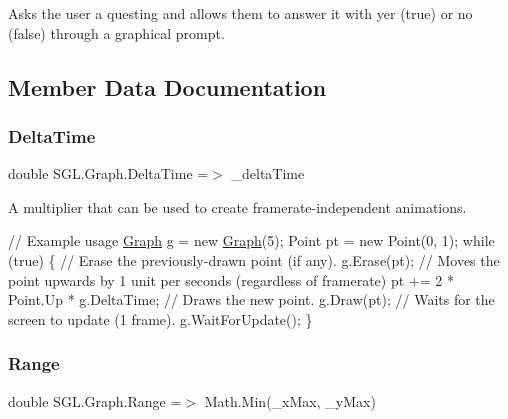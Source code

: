 Asks the user a questing and allows them to answer it with yer (true) or no (false) through a graphical prompt. 



\subsection{Member Data Documentation}
\mbox{\label{class_s_g_l_1_1_graph_a33da47cd9863c9a94953474ac52b02f8}} 
\subsubsection{\texorpdfstring{Delta\+Time}{DeltaTime}}
{\footnotesize\ttfamily double S\+G\+L.\+Graph.\+Delta\+Time =$>$ \+\_\+delta\+Time}



A multiplier that can be used to create framerate-\/independent animations. 


\begin{DoxyCode}
\textcolor{comment}{// Example usage}
\mbox{\hyperlink{class_s_g_l_1_1_graph_ae49041037b01a96e44314f7b3b9b6166}{Graph}} g = \textcolor{keyword}{new} \mbox{\hyperlink{class_s_g_l_1_1_graph_ae49041037b01a96e44314f7b3b9b6166}{Graph}}(5);
Point pt = \textcolor{keyword}{new} Point(0, 1);
\textcolor{keywordflow}{while} (\textcolor{keyword}{true}) 
\{
    \textcolor{comment}{// Erase the previously-drawn point (if any).}
    g.Erase(pt);
    \textcolor{comment}{// Moves the point upwards by 1 unit per seconds (regardless of framerate)}
    pt += 2 * Point.Up * g.DeltaTime;
    \textcolor{comment}{// Draws the new point.}
    g.Draw(pt);
    \textcolor{comment}{// Waits for the screen to update (1 frame).}
    g.WaitForUpdate();
\}
\end{DoxyCode}
 \mbox{\label{class_s_g_l_1_1_graph_a9f890698937c413d4892d7ad7e674f15}} 
\subsubsection{\texorpdfstring{Range}{Range}}
{\footnotesize\ttfamily double S\+G\+L.\+Graph.\+Range =$>$ Math.\+Min(\+\_\+x\+Max, \+\_\+y\+Max)}



